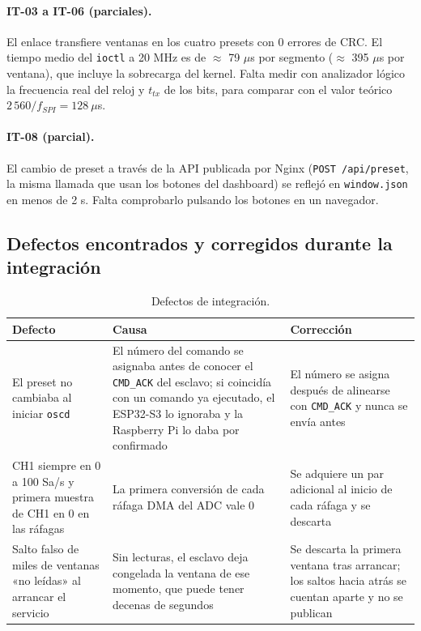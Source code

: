\documentclass[12pt,a4paper]{article}
\begin{document}
\paragraph{IT-03 a IT-06 (parciales).} El enlace transfiere ventanas en los cuatro presets con 0 errores de CRC. El tiempo medio del \texttt{ioctl} a 20 MHz es de $\approx$ 79 $\mu$s por segmento ($\approx$ 395 $\mu$s por ventana), que incluye la sobrecarga del kernel. Falta medir con analizador lógico la frecuencia real del reloj y $t_{tx}$ de los bits, para comparar con el valor teórico $2\,560/f_{SPI} = 128\ \mu$s.

\paragraph{IT-08 (parcial).} El cambio de preset a través de la API publicada por Nginx (\texttt{POST /api/preset}, la misma llamada que usan los botones del dashboard) se reflejó en \texttt{window.json} en menos de 2 s. Falta comprobarlo pulsando los botones en un navegador.

\subsection{Defectos encontrados y corregidos durante la integración}
\label{sec:defectos}

\begin{table}[H]
\centering
\small
\begin{tabular}{@{}p{3.6cm} p{5.6cm} p{5.6cm}@{}}
\toprule
\textbf{Defecto} & \textbf{Causa} & \textbf{Corrección} \\
\midrule
El preset no cambiaba al iniciar \texttt{oscd} & El número del comando se asignaba antes de conocer el \texttt{CMD\_ACK} del esclavo; si coincidía con un comando ya ejecutado, el ESP32-S3 lo ignoraba y la Raspberry Pi lo daba por confirmado & El número se asigna después de alinearse con \texttt{CMD\_ACK} y nunca se envía antes \\
CH1 siempre en 0 a 100 Sa/s y primera muestra de CH1 en 0 en las ráfagas & La primera conversión de cada ráfaga DMA del ADC vale 0 & Se adquiere un par adicional al inicio de cada ráfaga y se descarta \\
Salto falso de miles de ventanas «no leídas» al arrancar el servicio & Sin lecturas, el esclavo deja congelada la ventana de ese momento, que puede tener decenas de segundos & Se descarta la primera ventana tras arrancar; los saltos hacia atrás se cuentan aparte y no se publican \\
\bottomrule
\end{tabular}
\caption{Defectos de integración.}
\end{table}
\end{document}

